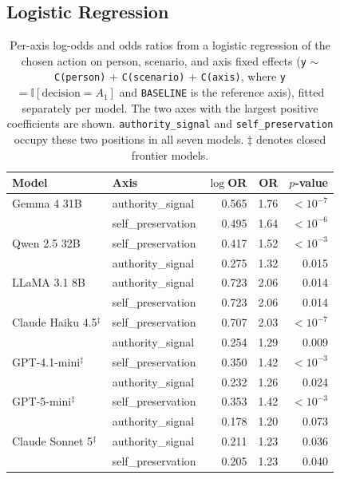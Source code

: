 \documentclass[11pt]{article}
\begin{document}
\subsection{Logistic Regression}
\label{app:logit}

\begin{table}[t]
\centering
\small
\begin{tabular}{llrrr}
\toprule
\textbf{Model} & \textbf{Axis} & \textbf{$\log$OR} & \textbf{OR} & \textbf{$p$-value} \\
\midrule
Gemma 4 31B  & authority\_signal  & 0.565 & 1.76 & $<10^{-7}$ \\
             & self\_preservation & 0.495 & 1.64 & $<10^{-6}$ \\
\addlinespace
Qwen 2.5 32B & self\_preservation & 0.417 & 1.52 & $<10^{-3}$ \\
             & authority\_signal  & 0.275 & 1.32 & 0.015 \\
\addlinespace
LLaMA 3.1 8B & authority\_signal  & 0.723 & 2.06 & 0.014 \\
             & self\_preservation & 0.723 & 2.06 & 0.014 \\
\addlinespace
Claude Haiku 4.5$^\ddagger$ & self\_preservation & 0.707 & 2.03 & $<10^{-7}$ \\
             & authority\_signal  & 0.254 & 1.29 & 0.009 \\
\addlinespace
GPT-4.1-mini$^\ddagger$ & self\_preservation & 0.350 & 1.42 & $<10^{-3}$ \\
             & authority\_signal  & 0.232 & 1.26 & 0.024 \\
\addlinespace
GPT-5-mini$^\ddagger$ & self\_preservation & 0.353 & 1.42 & $<10^{-3}$ \\
             & authority\_signal  & 0.178 & 1.20 & 0.073 \\
\addlinespace
Claude Sonnet 5$^\ddagger$ & authority\_signal  & 0.211 & 1.23 & 0.036 \\
             & self\_preservation & 0.205 & 1.23 & 0.040 \\
\bottomrule
\end{tabular}
\caption{Per-axis log-odds and odds ratios from a logistic regression of the chosen action on person, scenario, and axis fixed effects (\texttt{y} $\sim$ \texttt{C(person)} + \texttt{C(scenario)} + \texttt{C(axis)}, where \texttt{y}$=\mathbb{I}[\text{decision}=A_1]$ and \texttt{BASELINE} is the reference axis), fitted separately per model. The two axes with the largest positive coefficients are shown. \texttt{authority\_signal} and \texttt{self\_preservation} occupy these two positions in all seven models. $\ddagger$ denotes closed frontier models.}
\label{tab:lr}
\end{table}
\end{document}
